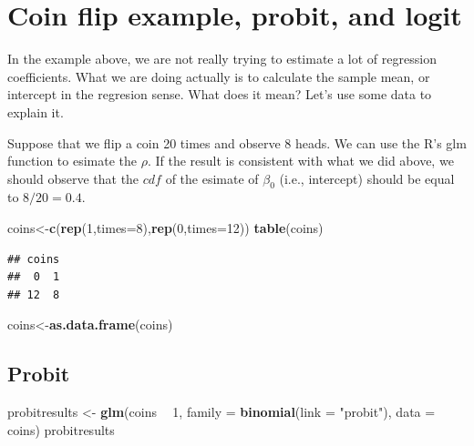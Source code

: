\documentclass[]{book}
\newenvironment{Shaded}{\begin{snugshade}}{\end{snugshade}}
\newcommand{\DataTypeTok}[1]{\textcolor[rgb]{0.13,0.29,0.53}{#1}}
\newcommand{\DecValTok}[1]{\textcolor[rgb]{0.00,0.00,0.81}{#1}}
\newcommand{\KeywordTok}[1]{\textcolor[rgb]{0.13,0.29,0.53}{\textbf{#1}}}
\newcommand{\NormalTok}[1]{#1}
\newcommand{\OperatorTok}[1]{\textcolor[rgb]{0.81,0.36,0.00}{\textbf{#1}}}
\newcommand{\StringTok}[1]{\textcolor[rgb]{0.31,0.60,0.02}{#1}}
\begin{document}
\hypertarget{coin-flip-example-probit-and-logit}{%
\section{Coin flip example, probit, and logit}\label{coin-flip-example-probit-and-logit}}

In the example above, we are not really trying to estimate a lot of regression coefficients. What we are doing actually is to calculate the sample mean, or intercept in the regresion sense. What does it mean? Let's use some data to explain it.

Suppose that we flip a coin 20 times and observe 8 heads. We can use the R's glm function to esimate the \(\rho\). If the result is consistent with what we did above, we should observe that the \(cdf\) of the esimate of \(\beta_0\) (i.e., intercept) should be equal to \(8/20=0.4\).

\begin{Shaded}
\begin{Highlighting}[]
\NormalTok{coins<-}\KeywordTok{c}\NormalTok{(}\KeywordTok{rep}\NormalTok{(}\DecValTok{1}\NormalTok{,}\DataTypeTok{times=}\DecValTok{8}\NormalTok{),}\KeywordTok{rep}\NormalTok{(}\DecValTok{0}\NormalTok{,}\DataTypeTok{times=}\DecValTok{12}\NormalTok{))}
\KeywordTok{table}\NormalTok{(coins)}
\end{Highlighting}
\end{Shaded}

\begin{verbatim}
## coins
##  0  1 
## 12  8
\end{verbatim}

\begin{Shaded}
\begin{Highlighting}[]
\NormalTok{coins<-}\KeywordTok{as.data.frame}\NormalTok{(coins)}
\end{Highlighting}
\end{Shaded}

\hypertarget{probit-1}{%
\subsection{Probit}\label{probit-1}}

\begin{Shaded}
\begin{Highlighting}[]
\NormalTok{probitresults <-}\StringTok{ }\KeywordTok{glm}\NormalTok{(coins }\OperatorTok{~}\StringTok{ }\DecValTok{1}\NormalTok{, }\DataTypeTok{family =} \KeywordTok{binomial}\NormalTok{(}\DataTypeTok{link =} \StringTok{"probit"}\NormalTok{), }\DataTypeTok{data =}\NormalTok{ coins)}
\NormalTok{probitresults}
\end{Highlighting}
\end{Shaded}
\end{document}
